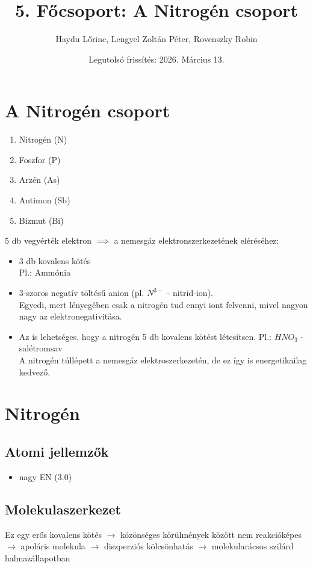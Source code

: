 \documentclass{article}
\title{5. Főcsoport: A Nitrogén csoport}
\author{Haydu Lőrinc, Lengyel Zoltán Péter, Rovenszky Robin}
\date{Legutolsó frissítés: 2026. Március 13.}
\begin{document}
\maketitle

\section{A Nitrogén csoport}
\begin{enumerate}
    \item Nitrogén (N)
    \item Foszfor (P)
    \item Arzén (As)
    \item Antimon (Sb)
    \item Bizmut (Bi)
\end{enumerate}

5 db vegyérték elektron $\implies$ a nemesgáz elektronszerkezetének eléréséhez:
\begin{itemize}
    \item 3 db kovalens kötés\\
    Pl.: Ammónia 
    \item 3-szoros negatív töltésű anion (pl. $N^{3-}$ - nitrid-ion). \\
    Egyedi, mert lényegében csak a nitrogén tud ennyi iont felvenni, mivel nagyon nagy az elektronegativitása.
    \item Az is lehetséges, hogy a nitrogén 5 db kovalens kötést létesítsen. Pl.: $HNO_3$ - salétromsav
    \\
    A nitrogén túllépett a nemesgáz elektroszerkezetén, de ez így is energetikailag kedvező.
\end{itemize}

\section{Nitrogén}
\subsection{Atomi jellemzők}
\begin{itemize}
    \item nagy EN (3.0)
\end{itemize}
\subsection{Molekulaszerkezet}
Ez egy erős kovalens kötés $\rightarrow$ közönséges körülmények között nem reakcióképes
$\rightarrow$ apoláris molekula $\rightarrow$ diszperziós kölcsönhatás $\rightarrow$ molekularácsos szilárd halmazállapotban
\end{document}
